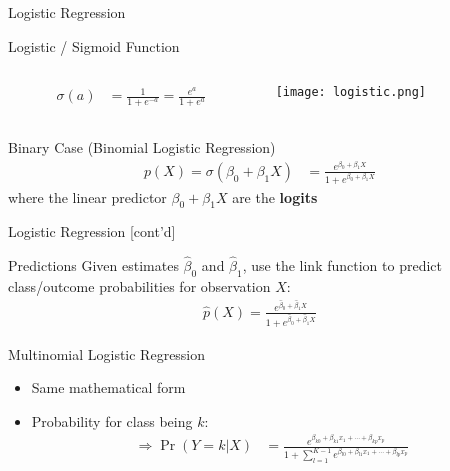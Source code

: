 \documentclass[ignorenonframetext,xcolor=x11names]{beamer}
\begin{document}
\begin{frame}{Logistic Regression}
\begin{block}{Logistic / Sigmoid Function}
\begin{columns}
\begin{column}{0.6\textwidth}
\begin{align*}
  \sigma(a) &= \frac{1}{1 + e^{-a}} = \frac{e^a}{1 + e^a} %
\end{align*}
\end{column}
\begin{column}{0.4\textwidth}
\texttt{[image: logistic.png]}
\end{column}
\end{columns}
\end{block}

\begin{block}{Binary Case (Binomial Logistic Regression)}
\small
\begin{align*}
p(X) = \sigma( \beta_0 + \beta_1 X) &= \frac{e^{\beta_0 + \beta_1 X}}{1 + e^{\beta_0 + \beta_1 X}} %
\end{align*}
where the linear predictor $\beta_0 + \beta_1 X$ are the \textbf{logits}
\end{block}
\end{frame}

\begin{frame}{Logistic Regression \small [cont'd]}
\begin{block}{Predictions}
Given estimates $\hat{\beta}_0$ and $\hat{\beta}_1$, use the link function to predict class/outcome probabilities for observation $X$:
\begin{align*}
  \hat{p}(X) = \frac{e^{\hat{\beta}_0 + \hat{\beta}_1 X}}{1 + e^{\hat{\beta}_0 + \hat{\beta}_1 X}}
\end{align*}
\end{block}
\begin{block}{Multinomial Logistic Regression}
\begin{itemize}
  \item Same mathematical form
  \item Probability for class being $k$:
\begin{align*}
\Rightarrow \Pr(Y=k|X) &= \frac{e^{\beta_{k0}+\beta_{k1}x_1 + \cdots + \beta_{kp}x_p}}{1 + \sum_{l=1}^{K-1} e^{\beta_{l0}+\beta_{l1}x_1 + \cdots + \beta_{lp}x_p}}
\end{align*}
\end{itemize}
\end{block}
\end{frame}
\end{document}
